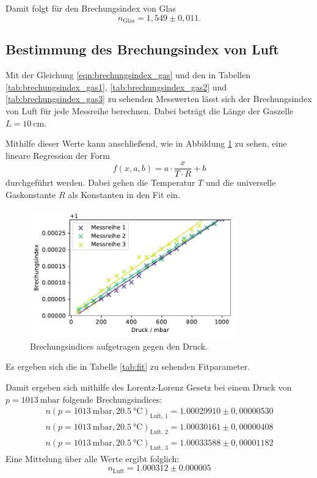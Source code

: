 Damit folgt für den Brechungsindex von Glas
\begin{equation}
    n_\text{Glas} = 1,549 \pm 0,011 .
\end{equation}

\subsection{Bestimmung des Brechungsindex von Luft}
Mit der Gleichung \ref{eqn:brechungsindex_gas} und den in Tabellen \ref{tab:brechungsindex_gas1}, \ref{tab:brechungsindex_gas2} und \ref{tab:brechungsindex_gas3} zu sehenden Messwerten lässt sich der Brechungsindex von Luft für jede Messreihe berechnen. Dabei beträgt die Länge der Gaszelle $L = \SI{10}{\centi \meter}$.



Mithilfe dieser Werte kann anschließend, wie in Abbildung \ref{fig:n} zu sehen,  eine lineare Regression der Form 
\begin{equation}
    f(x, a, b) = a \cdot \frac{x}{T \cdot R} + b
\end{equation}
durchgeführt werden. Dabei gehen die Temperatur $T$ und die universelle Gaskonstante $R$ als Konstanten in den Fit ein. 
\begin{figure}[H]
    \centering
    \includegraphics[width=0.8\textwidth]{data/Plots/Brechungsindex.pdf}
    \caption{Brechungsindices aufgetragen gegen den Druck. }
    \label{fig:n}
\end{figure}
Es ergeben sich die in Tabelle \ref{tab:fit} zu sehenden Fitparameter.

Damit ergeben sich mithilfe des Lorentz-Lorenz Gesetz bei einem Druck von $p = \SI{1013}{\milli \bar}$ folgende Brechungsindices:
\begin{align}                                 
    n(p = \SI{1013}{\milli \bar}, \SI{20,5}{\celsius} )_\text{Luft, 1} = 1.00029910 \pm 0,00000530   \\
    n(p = \SI{1013}{\milli \bar}, \SI{20,5}{\celsius} )_\text{Luft, 2} = 1.00030161 \pm 0,00000408   \\
    n(p = \SI{1013}{\milli \bar}, \SI{20,5}{\celsius} )_\text{Luft, 3} = 1.00033588 \pm 0,00001182  
\end{align}
Eine Mittelung über alle Werte ergibt folglich:
\begin{equation}
    n_\text{Luft} = 1.000312 \pm 0.000005
\end{equation}

